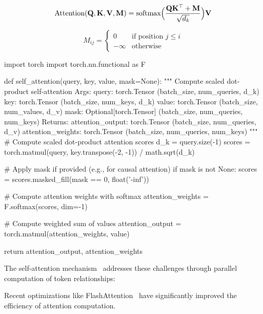 \begin{equation}\label{eq:masked_attention}
\text{Attention}(\mathbf{Q}, \mathbf{K}, \mathbf{V}, \mathbf{M}) 
= \text{softmax}\Bigl(\frac{\mathbf{Q} \mathbf{K}^\top + \mathbf{M}}{\sqrt{d_k}}\Bigr) \mathbf{V}
\end{equation}

\begin{equation}\label{eq:mask_matrix}
M_{ij} = \begin{cases}
    0 & \text{if position } j \leq i \\
    -\infty & \text{otherwise}
\end{cases}
\end{equation}

\begin{pythoncode}
import torch
import torch.nn.functional as F

def self_attention(query, key, value, mask=None):
    """
    Compute scaled dot-product self-attention
    Args:
        query: torch.Tensor (batch_size, num_queries, d_k)
        key: torch.Tensor (batch_size, num_keys, d_k)
        value: torch.Tensor (batch_size, num_values, d_v)
        mask: Optional[torch.Tensor] (batch_size, num_queries, num_keys)
    Returns:
        attention_output: torch.Tensor (batch_size, num_queries, d_v)
        attention_weights: torch.Tensor (batch_size, num_queries, num_keys)
    """
    # Compute scaled dot-product attention scores
    d_k = query.size(-1)
    scores = torch.matmul(query, key.transpose(-2, -1)) / math.sqrt(d_k)
    
    # Apply mask if provided (e.g., for causal attention)
    if mask is not None:
        scores = scores.masked_fill(mask == 0, float('-inf'))
    
    # Compute attention weights with softmax
    attention_weights = F.softmax(scores, dim=-1)
    
    # Compute weighted sum of values
    attention_output = torch.matmul(attention_weights, value)
    
    return attention_output, attention_weights
\end{pythoncode}

\noindent
The self-attention mechanism~\cite{vaswani2017attention,clark2022unified} addresses these challenges through parallel computation of token relationships:

Recent optimizations like FlashAttention~\cite{dao2022flashattention} have significantly improved the efficiency of attention computation.
